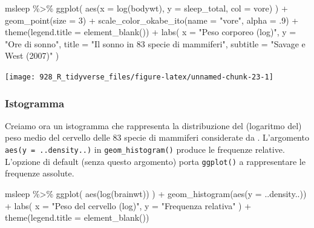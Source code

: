 \documentclass[
  10pt,
  italian,
  a4paper,
  extrafontsizes,onecolumn,openright
  ]{memoir}
\newenvironment{Shaded}{\begin{snugshade}}{\end{snugshade}}
\newcommand{\AttributeTok}[1]{\textcolor[rgb]{0.77,0.63,0.00}{#1}}
\newcommand{\DecValTok}[1]{\textcolor[rgb]{0.00,0.00,0.81}{#1}}
\newcommand{\FunctionTok}[1]{\textcolor[rgb]{0.00,0.00,0.00}{#1}}
\newcommand{\NormalTok}[1]{#1}
\newcommand{\SpecialCharTok}[1]{\textcolor[rgb]{0.00,0.00,0.00}{#1}}
\newcommand{\StringTok}[1]{\textcolor[rgb]{0.31,0.60,0.02}{#1}}
\begin{document}
\begin{Shaded}
\begin{Highlighting}[]
\NormalTok{msleep }\SpecialCharTok{\%\textgreater{}\%}
  \FunctionTok{ggplot}\NormalTok{(}
    \FunctionTok{aes}\NormalTok{(}\AttributeTok{x =} \FunctionTok{log}\NormalTok{(bodywt), }\AttributeTok{y =}\NormalTok{ sleep\_total, }\AttributeTok{col =}\NormalTok{ vore)}
\NormalTok{  ) }\SpecialCharTok{+}
  \FunctionTok{geom\_point}\NormalTok{(}\AttributeTok{size =} \DecValTok{3}\NormalTok{) }\SpecialCharTok{+}
  \FunctionTok{scale\_color\_okabe\_ito}\NormalTok{(}\AttributeTok{name =} \StringTok{"vore"}\NormalTok{, }\AttributeTok{alpha =}\NormalTok{ .}\DecValTok{9}\NormalTok{) }\SpecialCharTok{+}
  \FunctionTok{theme}\NormalTok{(}\AttributeTok{legend.title =} \FunctionTok{element\_blank}\NormalTok{()) }\SpecialCharTok{+}
  \FunctionTok{labs}\NormalTok{(}
    \AttributeTok{x =} \StringTok{"Peso corporeo (log)"}\NormalTok{,}
    \AttributeTok{y =} \StringTok{"Ore di sonno"}\NormalTok{,}
    \AttributeTok{title =} \StringTok{"Il sonno in 83 specie di mammiferi"}\NormalTok{,}
    \AttributeTok{subtitle =} \StringTok{"Savage e West (2007)"}
\NormalTok{  )}
\end{Highlighting}
\end{Shaded}

\begin{center}\texttt{[image: 928\_R\_tidyverse\_files/figure-latex/unnamed-chunk-23-1]} \end{center}

\hypertarget{istogramma}{%
\subsubsection{Istogramma}\label{istogramma}}

Creiamo ora un istogramma che rappresenta la distribuzione del (logaritmo del) peso medio del cervello delle 83 specie di mammiferi considerate da \textcite{savage2007quantitative}. L'argomento \texttt{aes(y\ =\ ..density..)} in \texttt{geom\_histogram()} produce le frequenze relative. L'opzione di default (senza questo argomento) porta \texttt{ggplot()} a rappresentare le frequenze assolute.

\begin{Shaded}
\begin{Highlighting}[]
\NormalTok{msleep }\SpecialCharTok{\%\textgreater{}\%} 
  \FunctionTok{ggplot}\NormalTok{(}
    \FunctionTok{aes}\NormalTok{(}\FunctionTok{log}\NormalTok{(brainwt))}
\NormalTok{  ) }\SpecialCharTok{+}
  \FunctionTok{geom\_histogram}\NormalTok{(}\FunctionTok{aes}\NormalTok{(}\AttributeTok{y =}\NormalTok{ ..density..)) }\SpecialCharTok{+}
  \FunctionTok{labs}\NormalTok{(}
    \AttributeTok{x =} \StringTok{"Peso del cervello (log)"}\NormalTok{,}
    \AttributeTok{y =} \StringTok{"Frequenza relativa"}
\NormalTok{  ) }\SpecialCharTok{+}
  \FunctionTok{theme}\NormalTok{(}\AttributeTok{legend.title =} \FunctionTok{element\_blank}\NormalTok{())}
\end{Highlighting}
\end{Shaded}
\end{document}
